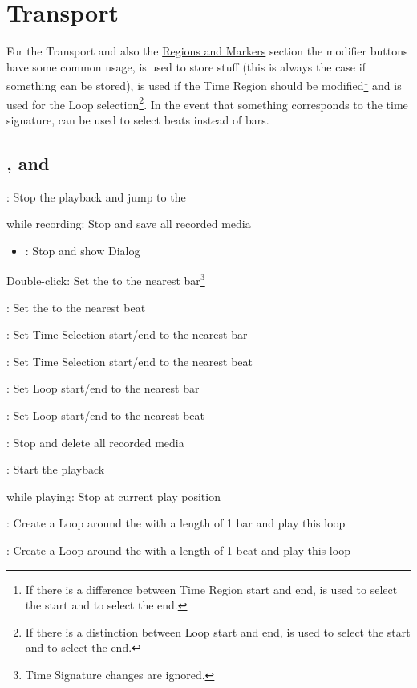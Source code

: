 
\section{Transport}\label{transport}

For the Transport and also the \hyperref[regions]{Regions and Markers} section
the modifier buttons have some common usage, \control is used to store stuff
(this is always the case if something can be stored), \option is used
if the Time Region should be modified\footnote{If there is a difference
between Time Region start and end, \shift is used to select the start and
\option to select the end.} and \alt is used for the Loop selection\footnote{If
there is a distinction between Loop start and end, \option is used to select the
start and \alt to select the end.}. In the event that something
corresponds to the time signature, \shift can be used to select beats instead of bars.
\subsection{\play, \stopp and \cancel}
\begin{itemize}
  \item \stopp: Stop the playback and jump to the \ec
  \bemod
  \begin {compactitem}
    \item while recording: Stop and save all recorded media
    \bebemod
        \begin {itemize}
          \item \alt: Stop and show Dialog
        \end{itemize}
        \item Double-click: Set the \ec to the nearest bar\footnote{Time
        Signature changes are ignored.}
        \bebemod
        \bebemod
        \begin {compactitem}
                \item \shift: Set the \ec to the nearest beat 
                \item \option: Set Time Selection start/end to the nearest bar
                \item \shift \option:  Set Time Selection start/end to the nearest beat
                \item \alt: Set Loop start/end to the nearest bar
                \item \shift \alt: Set Loop start/end to the nearest beat
        \end{compactitem}
  \end{compactitem}
  \item \cancel: Stop and delete all recorded media
  \item \play: Start the playback
  \bemod
  \begin {compactitem}
    \item while playing: Stop at current play position
    \item \alt: Create a Loop around the \ec with a length of 1 bar and
    play this loop
    \item \shift \alt: Create a Loop around the \ec with a length of 1
    beat and play this loop
  \end{compactitem}
\end{itemize}

